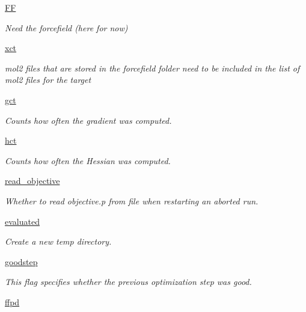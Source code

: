 \begin{DoxyCompactItemize}
\hyperlink{classsrc_1_1target_1_1Target_a64e2f22daa347019ca8beb482c4b59f6}{FF}
\begin{DoxyCompactList}\small\item\em Need the forcefield (here for now) \end{DoxyCompactList}\item 
\hyperlink{classsrc_1_1target_1_1Target_a399fd456592279c108753f3694950620}{xct}
\begin{DoxyCompactList}\small\item\em mol2 files that are stored in the forcefield folder need to be included in the list of mol2 files for the target \end{DoxyCompactList}\item 
\hyperlink{classsrc_1_1target_1_1Target_a12d4d43cc0344c23e687941c6df7c1c7}{gct}
\begin{DoxyCompactList}\small\item\em Counts how often the gradient was computed. \end{DoxyCompactList}\item 
\hyperlink{classsrc_1_1target_1_1Target_a7964ee4d0c5d7c249b50aa97bcafc73e}{hct}
\begin{DoxyCompactList}\small\item\em Counts how often the Hessian was computed. \end{DoxyCompactList}\item 
\hyperlink{classsrc_1_1target_1_1Target_a0d3f766725247a90dc1b4ab8ec89e1c9}{read\+\_\+objective}
\begin{DoxyCompactList}\small\item\em Whether to read objective.\+p from file when restarting an aborted run. \end{DoxyCompactList}\item 
\hyperlink{classsrc_1_1target_1_1Target_a49df3701811acb53bcabb298a101ac2b}{evaluated}
\begin{DoxyCompactList}\small\item\em Create a new temp directory. \end{DoxyCompactList}\item 
\hyperlink{classsrc_1_1target_1_1Target_a60944e53d96d66201273a52027896abb}{goodstep}
\begin{DoxyCompactList}\small\item\em This flag specifies whether the previous optimization step was good. \end{DoxyCompactList}\item 
\hyperlink{classsrc_1_1target_1_1Target_a48209401694b7ab1cd207f9f214caa7a}{ffpd}
\end{DoxyCompactItemize}


